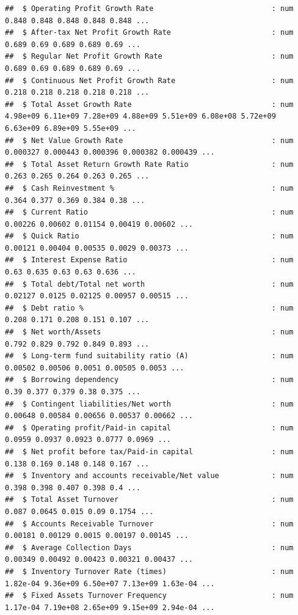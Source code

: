 \documentclass[
]{book}
\begin{document}
\begin{verbatim}
##  $ Operating Profit Growth Rate                           : num  0.848 0.848 0.848 0.848 0.848 ...
##  $ After-tax Net Profit Growth Rate                       : num  0.689 0.69 0.689 0.689 0.69 ...
##  $ Regular Net Profit Growth Rate                         : num  0.689 0.69 0.689 0.689 0.69 ...
##  $ Continuous Net Profit Growth Rate                      : num  0.218 0.218 0.218 0.218 0.218 ...
##  $ Total Asset Growth Rate                                : num  4.98e+09 6.11e+09 7.28e+09 4.88e+09 5.51e+09 6.08e+08 5.72e+09 6.63e+09 6.89e+09 5.55e+09 ...
##  $ Net Value Growth Rate                                  : num  0.000327 0.000443 0.000396 0.000382 0.000439 ...
##  $ Total Asset Return Growth Rate Ratio                   : num  0.263 0.265 0.264 0.263 0.265 ...
##  $ Cash Reinvestment %                                    : num  0.364 0.377 0.369 0.384 0.38 ...
##  $ Current Ratio                                          : num  0.00226 0.00602 0.01154 0.00419 0.00602 ...
##  $ Quick Ratio                                            : num  0.00121 0.00404 0.00535 0.0029 0.00373 ...
##  $ Interest Expense Ratio                                 : num  0.63 0.635 0.63 0.63 0.636 ...
##  $ Total debt/Total net worth                             : num  0.02127 0.0125 0.02125 0.00957 0.00515 ...
##  $ Debt ratio %                                           : num  0.208 0.171 0.208 0.151 0.107 ...
##  $ Net worth/Assets                                       : num  0.792 0.829 0.792 0.849 0.893 ...
##  $ Long-term fund suitability ratio (A)                   : num  0.00502 0.00506 0.0051 0.00505 0.0053 ...
##  $ Borrowing dependency                                   : num  0.39 0.377 0.379 0.38 0.375 ...
##  $ Contingent liabilities/Net worth                       : num  0.00648 0.00584 0.00656 0.00537 0.00662 ...
##  $ Operating profit/Paid-in capital                       : num  0.0959 0.0937 0.0923 0.0777 0.0969 ...
##  $ Net profit before tax/Paid-in capital                  : num  0.138 0.169 0.148 0.148 0.167 ...
##  $ Inventory and accounts receivable/Net value            : num  0.398 0.398 0.407 0.398 0.4 ...
##  $ Total Asset Turnover                                   : num  0.087 0.0645 0.015 0.09 0.1754 ...
##  $ Accounts Receivable Turnover                           : num  0.00181 0.00129 0.0015 0.00197 0.00145 ...
##  $ Average Collection Days                                : num  0.00349 0.00492 0.00423 0.00321 0.00437 ...
##  $ Inventory Turnover Rate (times)                        : num  1.82e-04 9.36e+09 6.50e+07 7.13e+09 1.63e-04 ...
##  $ Fixed Assets Turnover Frequency                        : num  1.17e-04 7.19e+08 2.65e+09 9.15e+09 2.94e-04 ...

\end{verbatim}
\end{document}
